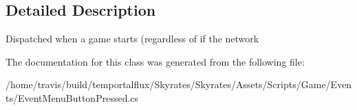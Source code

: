 \subsection{Detailed Description}
Dispatched when a game starts (regardless of if the network 



The documentation for this class was generated from the following file\-:\begin{DoxyCompactItemize}
\item 
/home/travis/build/temportalflux/\-Skyrates/\-Skyrates/\-Assets/\-Scripts/\-Game/\-Events/Event\-Menu\-Button\-Pressed.\-cs\end{DoxyCompactItemize}
